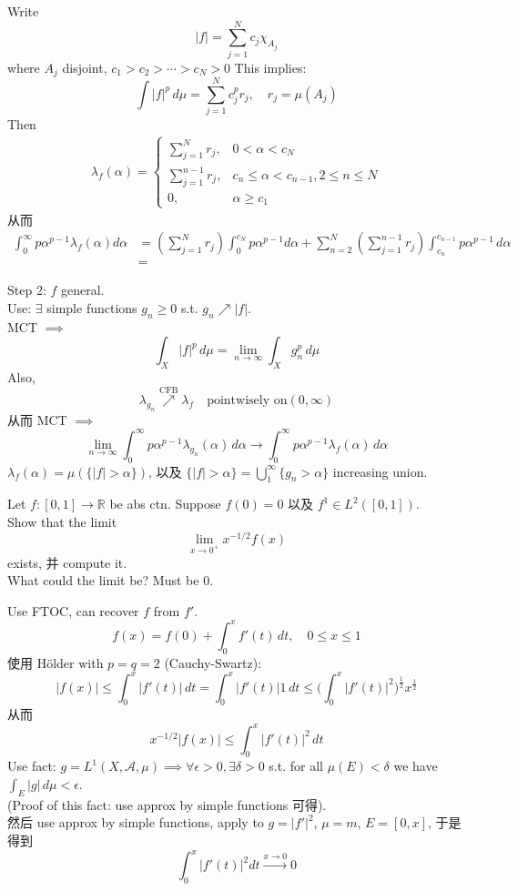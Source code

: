 \documentclass[lang=cn,11pt]{elegantbook}
\begin{document}
Write \[
|f| = \sum_{j=1}^N c_j \chi_{A_j} 
\]where $A_j$ disjoint, $c_1 > c_2 > \cdots >  c_N > 0$
This implies: \[
\int |f| ^p \, d\mu = \sum_{j=1}^N c_j^p r_j,\quad r_j = \mu(A_j)
 \]
Then
\begin{align*}
\lambda_f (\alpha) = \begin{cases}
    \sum_{j=1}^N r_j,& 0 < \alpha < c_N\\
    \sum_{j=1}^{n-1} r_j,&c_n \leq \alpha  < c_{n-1}, 2\leq n \leq N\\
    0,& \alpha \geq c_1
\end{cases}    
\end{align*}
从而 
\begin{align*}
    \int_0^\infty p \alpha^{p-1} \lambda_f (\alpha) d\alpha & = (\sum_{j=1}^N r_j) \int_0^{c_N} p \alpha^{p-1} d\alpha + \sum_{n=2}^N (\sum_{j=1}^{n-1} r_j ) \int_{c_n}^{c_{n-1}} p\alpha^{p-1} \, d\alpha\\
    & = 
\end{align*}


Step 2: $f$ general.\\
Use: $\exists$ simple functions $g_n \geq 0$ s.t. $g_n \nearrow |f|$.\\
 MCT $\implies $ \[
 \int_X |f|^p \,d \mu = \lim_{n\to \infty} \int_X g_n^p \, d\mu
 \]
 Also, \[
\lambda_{g_n} \overset{\text{CFB} }{\nearrow  }  \lambda_f \quad \text{pointwisely on} (0,\infty)
 \]
从而  MCT $\implies $ \[
\lim_{n\to \infty} \int_0^\infty p\alpha^{p-1} \lambda_{g_n}(\alpha) \, d\alpha \to \int_0^\infty p \alpha^{p-1} \lambda_f (\alpha ) \, d\alpha
\]
$\lambda_f(\alpha) = \mu(\{ |f| > \alpha\})$, 以及 $\{ |f| > \alpha \} = \bigcup_1^\infty \{g_n > \alpha \} $ increasing union.




\begin{example}
    Let $f:[0,1] \to \mathbb{R}$ be abs ctn. Suppose $f(0)  = 0$ 以及 $f^1 \in L^2([0,1])$.\\
    Show that the limit \[
    \lim_{x \to 0^+} x^{-1/2} f(x)
    \]exists, 并 compute it.\\
    What could the limit be? Must be $0$.\\
\begin{solution}
    Use FTOC, can recover $f$ from $f'$.\\
    \[
    f(x) = f(0) + \int_0^x f'(t) \, dt,\quad 0\leq x \leq 1
    \]
    使用 Hölder with $p=q =2$ (Cauchy-Swartz): \[
    |f(x)| \leq \int_0^x |f'(t)| \, dt = \int_0^x |f'(t) | 1\, dt  \leq \bigg(\int_0^x |f'(t)|^2\bigg)^\frac{1}{2} x^{\frac{1}{2}}
    \]
    从而 \[
    x^{-1/2} |f(x)| \leq \int_0^x |f'(t) | ^2 \, dt 
    \]
    Use fact: \(    g = L^1 (X,\mathcal{A},\mu) \implies \forall \epsilon > 0, \exists \delta > 0\) s.t. for all $\mu(E) < \delta $ we have $\int_E |g| \, d\mu < \epsilon$.\\
  (Proof of this fact: use approx by simple functions 可得).\\
  然后 use approx by simple functions, apply to $g = |f'|^2$, $\mu = m$, $E = [0,x]$, 于是得到 \[
  \int_0^x |f'(t)| ^2 dt \overset{x\to 0}{\longrightarrow} 0
  \]
\end{solution}
\end{example}
\end{document}
